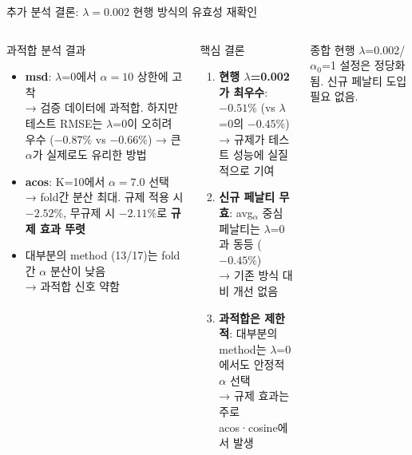 \documentclass[aspectratio=169,10pt]{beamer}
\begin{document}
\begin{frame}[shrink=10]{추가 분석 결론: $\lambda=0.002$ 현행 방식의 유효성 재확인}
	\begin{columns}[T]
			\begin{block}{과적합 분석 결과}
				\begin{itemize}
					\item \textbf{msd}: $\lambda$=0에서 $\alpha=10$ 상한에 고착 \\ \small → 검증 데이터에 과적합. 하지만 테스트 RMSE는 $\lambda$=0이 오히려 우수 ($-0.87\%$ vs $-0.66\%$) → 큰 $\alpha$가 실제로도 유리한 방법
					\item \textbf{acos}: K=10에서 $\alpha=7.0$ 선택 → fold간 분산 최대. 규제 적용 시 $-2.52\%$, 무규제 시 $-2.11\%$로 \textbf{규제 효과 뚜렷}
					\item 대부분의 method (13/17)는 fold간 $\alpha$ 분산이 낮음 \\ \small → 과적합 신호 약함
				\end{itemize}
			\end{block}

			\begin{alertblock}{핵심 결론}
				\begin{enumerate}
					\item \textbf{현행 $\lambda$=0.002가 최우수}: $-0.51\%$ (vs $\lambda$=0의 $-0.45\%$) \\ \small → 규제가 테스트 성능에 실질적으로 기여
					\item \textbf{신규 페날티 무효}: avg$_\alpha$ 중심 페날티는 $\lambda$=0과 동등 ($-0.45\%$) \\ \small → 기존 방식 대비 개선 없음
					\item \textbf{과적합은 제한적}: 대부분의 method는 $\lambda$=0에서도 안정적 $\alpha$ 선택 \\ \small → 규제 효과는 주로 acos·cosine에서 발생
				\end{enumerate}
			\end{alertblock}
			\begin{block}{종합}
				현행 $\lambda$=0.002/$\alpha_0$=1 설정은 정당화됨. 신규 페날티 도입 필요 없음.
			\end{block}
	\end{columns}
\end{frame}

\appendix
\end{document}
